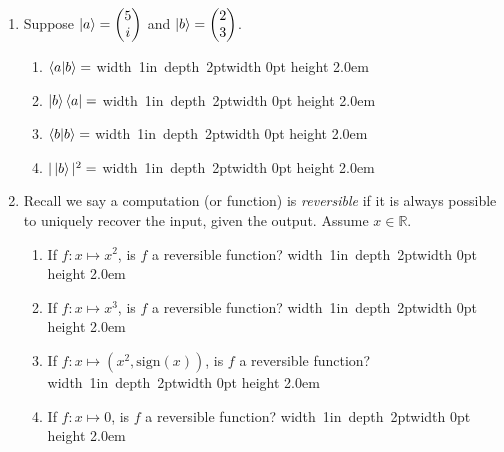 \documentclass[12pt]{article}
\newcommand{\Blank}{\mbox{\hskip 4pt\vrule width 1in depth 2pt}\vrule width 0pt height 2.0em}
\begin{document}
\begin{enumerate}[font=\bfseries]
    \item {} Suppose $\ket{a} = \begin{pmatrix}5 \\ i \end{pmatrix}$ and $\ket{b} = \begin{pmatrix}2 \\ 3 \end{pmatrix}$.\begin{enumerate}[label=\theenumi.\arabic*]
        \item $\braket{a|b} = $ \Blank{} \item $\ket{b}\bra{a} = $ \Blank{}
        \item $\braket{b|b} = $ \Blank{} \item $|\ket{b}|^2 = $ \Blank{}
    \end{enumerate}
        \item {} Recall we say a computation (or function) is \emph{reversible} if it is always possible to uniquely recover the input, given the output. Assume $x \in \mathbb{R}$.
    \begin{enumerate}[label=\theenumi.\arabic*]
        \item If $f : x \mapsto x^2$, is $f$ a reversible function? \Blank{}
        \item If $f : x \mapsto x^3$, is $f$ a reversible function? \Blank{}
        \item If $f : x \mapsto (x^2,\textrm{sign}(x))$, is $f$ a reversible function? \Blank{}
        \item If $f : x \mapsto 0$, is $f$ a reversible function? \Blank{}
    \end{enumerate}
 
    
\end{enumerate}
\end{document}
